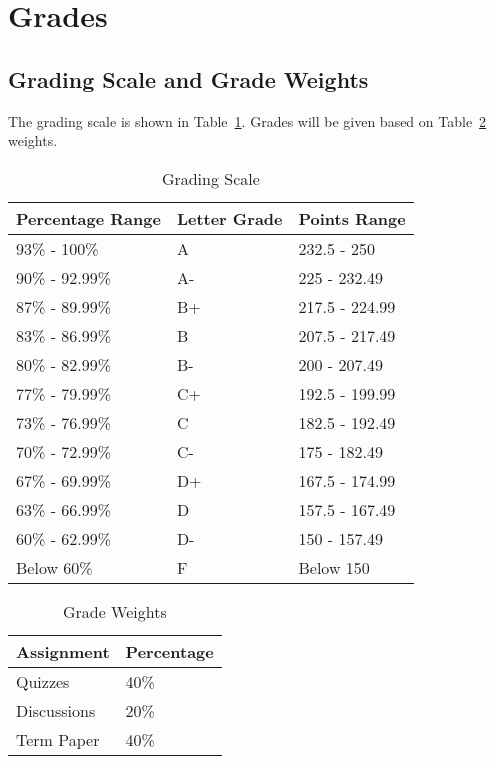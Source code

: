 \documentclass[11pt, letterpaper]{article}
\begin{document}
\section{Grades}

\subsection*{Grading Scale and Grade Weights}  
The grading scale is shown in Table~\ref{tab:grading-scale}. Grades will be given based on Table~\ref{tab:grade-weights} weights.

\begin{table}[ht]
\centering
\caption{Grading Scale}
\begin{tabular}{lll}
\toprule
\textbf{Percentage Range} & \textbf{Letter Grade} & \textbf{Points Range} \\
\midrule
93\% - 100\% & A & 232.5 - 250 \\
90\% - 92.99\% & A- & 225 - 232.49 \\
87\% - 89.99\% & B+ & 217.5 - 224.99 \\
83\% - 86.99\% & B & 207.5 - 217.49 \\
80\% - 82.99\% & B- & 200 - 207.49 \\
77\% - 79.99\% & C+ & 192.5 - 199.99 \\
73\% - 76.99\% & C & 182.5 - 192.49 \\
70\% - 72.99\% & C- & 175 - 182.49 \\
67\% - 69.99\% & D+ & 167.5 - 174.99 \\
63\% - 66.99\% & D & 157.5 - 167.49 \\
60\% - 62.99\% & D- & 150 - 157.49 \\
Below 60\% & F & Below 150 \\
\bottomrule
\end{tabular}
\label{tab:grading-scale}
\end{table}

\begin{table}[ht]
    \centering
    \caption{Grade Weights}
    \begin{tabular}{ll}
        \toprule
    \textbf{Assignment} & \textbf{Percentage} \\
    \midrule
    Quizzes & 40\% \\
    Discussions & 20\% \\
    Term Paper & 40\% \\
    \bottomrule
    \end{tabular}
    \label{tab:grade-weights}
    \end{table}
\end{document}
